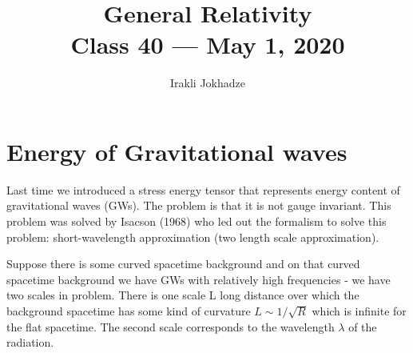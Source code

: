 \documentclass[11pt]{article}
\title{{\Huge General Relativity}\\{\Large{Class 40 --- May 1, 2020}}} %
\author{Irakli Jokhadze}
\begin{document}
\maketitle
\flushbottom
\newpage
\pagestyle{fancynotes}



\section{Energy of Gravitational waves}
Last time we introduced a stress energy tensor that represents energy content of gravitational waves (GWs). The problem is that it is not gauge invariant.
This problem was solved by Isacson (1968) who led out the formalism to solve this problem: short-wavelength approximation (two length scale approximation).

Suppose there is some curved spacetime background and on that curved spacetime background we have GWs with relatively high frequencies - we have two scales in problem.
There is one scale L long distance over which the background spacetime has some kind of curvature $L \sim 1/\sqrt{R}$ which is infinite for the flat spacetime.
The second scale corresponds to the wavelength $\lambda$ of the radiation.  
 
\end{document}
